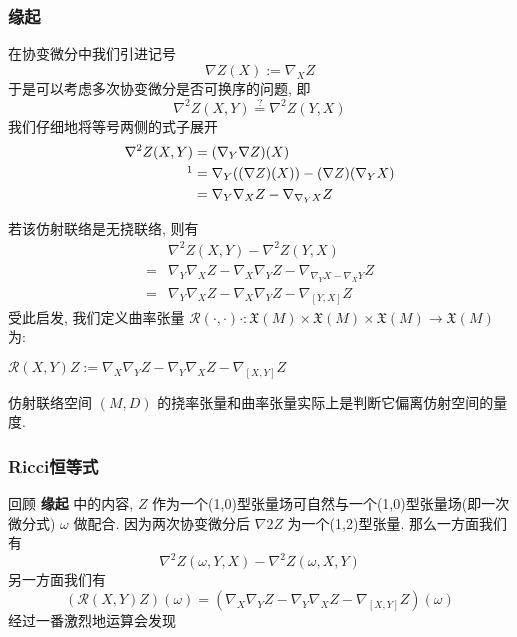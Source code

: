 \subsubsection{缘起}
    在协变微分中我们引进记号
    \begin{equation*}
        \nabla Z(X) :=\nabla_X{Z}
    \end{equation*}
    于是可以考虑多次协变微分是否可换序的问题, 即
    \begin{equation*}
        \nabla^2Z(X,Y) \stackrel{?}{=} \nabla^2Z(Y,X)
    \end{equation*}
    我们仔细地将等号两侧的式子展开
    \begin{align*}
        \nabla^2Z(X,Y) &= (\nabla_Y\nabla Z)(X) \\ 
        \footnotemark
        &= \nabla_Y((\nabla Z)(X)) - (\nabla Z)(\nabla_Y{X}) \\
        &= \nabla_Y\nabla_X{Z}-\nabla_{\nabla_Y{X}}Z
    \end{align*}
    
    若该仿射联络是无挠联络, 则有
    \begin{align*}
        & \nabla^2Z(X,Y) - \nabla^2Z(Y,X) \\
        =& \nabla_Y\nabla_X{Z}-\nabla_X\nabla_Y{Z}-\nabla_{\nabla_Y{X}-\nabla_X{Y}}Z \\
        =& \nabla_Y\nabla_X{Z}-\nabla_X\nabla_Y{Z}-\nabla_{[Y,X]}Z
    \end{align*}
    受此启发, 我们定义曲率张量 $\mathcal{R}(\cdot,\cdot)\cdot:\mathfrak{X}(M)\times\mathfrak{X}(M)\times\mathfrak{X}(M)\rightarrow\mathfrak{X}(M)$ 为:
    \begin{definition}
        $\mathcal{R}(X,Y)Z := \nabla_X\nabla_Y{Z} - \nabla_Y\nabla_X{Z} - \nabla_{[X,Y]}Z$
    \end{definition}
    
    \begin{remark}
        仿射联络空间 $(M,D)$ 的挠率张量和曲率张量实际上是判断它偏离仿射空间的量度.
    \end{remark}

\subsubsection{Ricci恒等式}
回顾 \textbf{缘起} 中的内容, $Z$ 作为一个(1,0)型张量场可自然与一个(1,0)型张量场(即一次微分式) $\omega$ 做配合. 因为两次协变微分后 $\nabla2{Z}$ 为一个(1,2)型张量. 
那么一方面我们有
\begin{equation*}
    \nabla^2Z(\omega,Y,X) - \nabla^2Z(\omega,X,Y)
\end{equation*}
另一方面我们有
\begin{equation*}
    (\mathcal{R}(X,Y)Z)(\omega) = (\nabla_X\nabla_Y{Z} - \nabla_Y\nabla_X{Z}-\nabla_{[X,Y]}{Z})(\omega)
\end{equation*}
经过一番激烈地运算会发现

